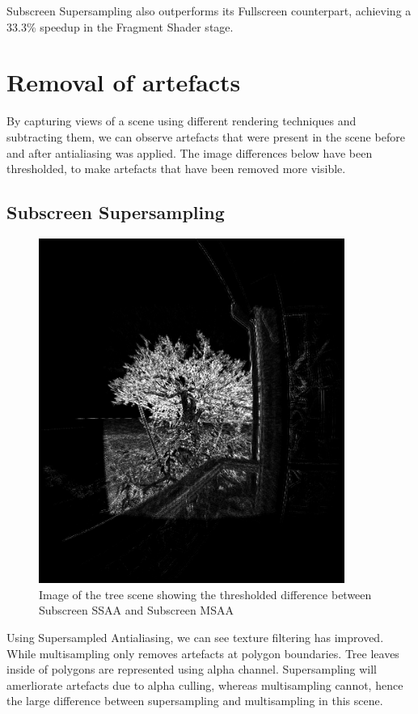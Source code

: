 \documentclass[12pt,a4paper,twoside,openright]{report}
\begin{document}
Subscreen Supersampling also outperforms its Fullscreen counterpart, achieving a 33.3\% speedup in the Fragment Shader stage. 

\section{Removal of artefacts}
By capturing views of a scene using different rendering techniques and subtracting them, we can observe artefacts that were present in the scene before and after antialiasing was applied. The image differences below have been thresholded, to make artefacts that have been removed more visible. 

\subsection{Subscreen Supersampling}

\begin{figure}[tbh]
\centerline{\includegraphics[width=10cm]{figs/difftree.png}}
\caption{Image of the tree scene showing the thresholded difference between Subscreen SSAA and Subscreen MSAA}
\label{ssaatree}
\end{figure}

Using Supersampled Antialiasing, we can see texture filtering has improved. While multisampling only removes artefacts at polygon boundaries. Tree leaves inside of polygons are represented using alpha channel. Supersampling will amerliorate artefacts due to alpha culling, whereas multisampling cannot, hence the large difference between supersampling and multisampling in this scene.
\end{document}
